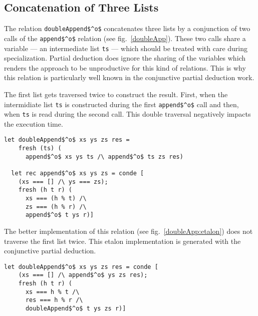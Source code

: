 \subsection{Concatenation of Three Lists}

The relation \lstinline{doubleAppend$^o$} concatenates three lists by a conjunction of two calls of the \lstinline{append$^o$} relation (see fig.~\ref{doubleApp}).
These two calls share a variable --- an intermediate list \lstinline{ts} --- which should be treated with care during specialization.
Partial deduction does ignore the sharing of the variables which renders the approach to be unproductive for this kind of relations.
This is why this relation is particularly well known in the conjunctive partial deduction work.

The first list gets traversed twice to construct the result.
First, when the intermidiate list \lstinline{ts} is constructed during the first \lstinline{append$^o$} call and then, when \lstinline{ts} is read during the second call.
This double traversal negatively impacts the execution time.

\begin{figure*}[!h]
  \centering
  \begin{minipage}{0.6\textwidth}
    \begin{lstlisting}[label={doubleApp}, caption={Concatenation of three lists}, captionpos=b, frame=tb]
  let doubleAppend$^o$ xs ys zs res =
    fresh (ts) (
      append$^o$ xs ys ts /\ append$^o$ ts zs res)

  let rec append$^o$ xs ys zs = conde [
    (xs === [] /\ ys === zs);
    fresh (h t r) (
      xs === (h % t) /\
      zs === (h % r) /\
      append$^o$ t ys r)]
    \end{lstlisting}
  \end{minipage}
\end{figure*}

The better implementation of this relation (see fig.~\ref{doubleApp:etalon}) does not traverse the first list twice.
This etalon implementation is generated with the conjunctive partial deduction.

\begin{figure*}[!h]
  \centering
  \begin{minipage}{0.6\textwidth}
    \begin{lstlisting}[label={doubleApp:etalon}, caption={Etalon implementation of concatenation of three lists}, captionpos=b, frame=tb]
  let doubleAppend$^o$ xs ys zs res = conde [
    (xs === [] /\ append$^o$ ys zs res);
    fresh (h t r) (
      xs === h % t /\
      res === h % r /\
      doubleAppend$^o$ t ys zs r)]
    \end{lstlisting}
  \end{minipage}
\end{figure*}

